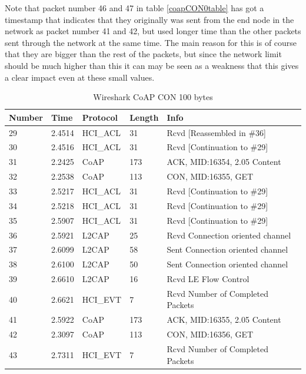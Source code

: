 \noindent Note that packet number 46 and 47 in table \ref{coapCON0table} has got a timestamp that indicates that they originally was sent from the end node in the network as packet number 41 and 42, but used longer time than the other packets sent through the network at the same time. The main reason for this is of course that they are bigger than the rest of the packets, but since the network limit should be much higher than this it can may be seen as a weakness that this gives a clear impact even at these small values.  


\begin{table}[H]
\centering
\caption{Wireshark CoAP CON 100 bytes}
\label{coapCON100table}
\begin{tabular}{lllll}
Number & Time   & Protocol & Length & Info                             \\ \hline
29     & 2.4514 & HCI\_ACL & 31     & Rcvd {[}Reassembled in \#36{]}   \\
30     & 2.4516 & HCI\_ACL & 31     & Rcvd {[}Continuation to \#29{]}  \\
31     & 2.2425 & CoAP     & 173    & ACK, MID:16354, 2.05 Content     \\
32     & 2.2538 & CoAP     & 113    & CON, MID:16355, GET              \\
33     & 2.5217 & HCI\_ACL & 31     & Rcvd {[}Continuation to \#29{]}  \\
34     & 2.5218 & HCI\_ACL & 31     & Rcvd {[}Continuation to \#29{]}  \\
35     & 2.5907 & HCI\_ACL & 31     & Rcvd {[}Continuation to \#29{]}  \\
36     & 2.5921 & L2CAP    & 25     & Rcvd Connection oriented channel \\
37     & 2.6099 & L2CAP    & 58     & Sent Connection oriented channel \\
38     & 2.6100 & L2CAP    & 50     & Sent Connection oriented channel \\
39     & 2.6610 & L2CAP    & 16     & Rcvd LE Flow Control             \\
40     & 2.6621 & HCI\_EVT & 7      & Rcvd Number of Completed Packets \\
41     & 2.5922 & CoAP     & 173    & ACK, MID:16355, 2.05 Content     \\
42     & 2.3097 & CoAP     & 113    & CON, MID:16356, GET              \\ 
43     & 2.7311 & HCI\_EVT & 7      & Rcvd Number of Completed Packets \\ \hline
\end{tabular}
\end{table}

